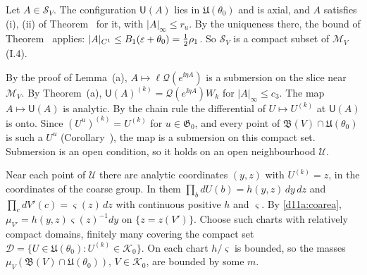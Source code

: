 \begin{detail}\label{d11a:A5}
\begin{step}
Let $A\in\mathcal S_V$. The configuration $\mathsf U(A)$ lies in $\mathfrak U(\theta_0)$ and is axial, and $A$ satisfies (i), (ii) of Theorem~ for it, with $|A|_\infty\le r_u$. By the uniqueness there, the bound of Theorem~ applies: $|A|_{C^1}\le B_1(\varepsilon+\theta_0)=\frac12\rho_1$. So $\mathcal S_V$ is a compact subset of $\mathcal M_V$ (I.4).
\end{step}
\begin{step}[Submersion]
By the proof of Lemma~(a), $A\mapsto\ell\mathcal Q(e^{\ii\eta A})$ is a submersion on the slice near $\mathcal M_V$. By Theorem~(a), $\mathsf U(A)^{(k)}=\mathcal Q(e^{\ii\eta A})W_k$ for $|A|_\infty\le c_3$. The map $A\mapsto\mathsf U(A)$ is analytic. By the chain rule the differential of $U\mapsto U^{(k)}$ at $\mathsf U(A)$ is onto. Since $(U^u)^{(k)}=U^{(k)}$ for $u\in\mathfrak G_0$, and every point of $\mathfrak B(V)\cap\mathfrak U(\theta_0)$ is such a $U^u$ (Corollary~), the map is a submersion on this compact set. Submersion is an open condition, so it holds on an open neighbourhood $\mathcal U$.
\end{step}
\begin{step}
Near each point of $\mathcal U$ there are analytic coordinates $(y,z)$ with $U^{(k)}=z$, in the coordinates of the coarse group. In them $\prod_bdU(b)=h(y,z)\,dy\,dz$ and $\prod_cdV'(c)=\varsigma(z)\,dz$ with continuous positive $h$ and $\varsigma$. By \eqref{d11a:coarea}, $\mu_{V'}=h(y,z)\varsigma(z)^{-1}dy$ on $\{z=z(V')\}$. Choose such charts with relatively compact domains, finitely many covering the compact set $\mathcal D=\{U\in\mathfrak U(\theta_0):U^{(k)}\in\mathcal K_0\}$. On each chart $h/\varsigma$ is bounded, so the masses $\mu_V(\mathfrak B(V)\cap\mathfrak U(\theta_0))$, $V\in\mathcal K_0$, are bounded by some $m$.
\end{step}
\end{detail}

